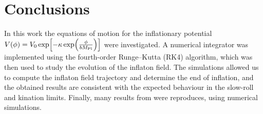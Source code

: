 

\section*{Conclusions}

In this work the equations of motion for the inflationary potential
$V(\phi)=V_0 \exp\!\left[-\kappa \exp\!\left(\frac{\phi}{b M_{\rm Pl}}\right)\right]$ were investigated. A numerical integrator was implemented using the fourth-order Runge--Kutta (RK4) algorithm, which was then used to study the evolution of the inflaton field. The simulations allowed us to compute the inflaton field trajectory and determine the end of inflation, and the obtained results are consistent with the expected behaviour in the slow-roll and kination limits. Finally, many results from \cite{kofman1997towards} were reproduces, using numerical simulations. 
